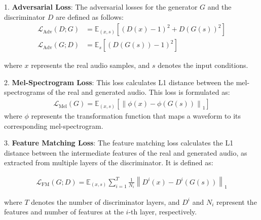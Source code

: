 1. \textbf{Adversarial Loss}: The adversarial losses for the generator \(G\) and the discriminator \(D\) are defined as follows:
\begin{align}
    \mathcal{L}_{\text{Adv}}(D; G) &= \mathbb{E}_{(x, s)} \left[(D(x) - 1)^2 + D(G(s))^2 \right] \\
    \mathcal{L}_{\text{Adv}}(G; D) &= \mathbb{E}_{s} \left[(D(G(s)) - 1)^2 \right]
\end{align}

where \(x\) represents the real audio samples, and \(s\) denotes the input conditions.

2. \textbf{Mel-Spectrogram Loss}: This loss calculates L1 distance between the mel-spectrograms of the real and generated audio. This loss is formulated as:
\begin{align}
    \mathcal{L}_{\text{Mel}}(G) = \mathbb{E}_{(x, s)} \left[\left\| \phi(x) - \phi(G(s)) \right\|_{1}\right]
\end{align}
where \(\phi\) represents the transformation function that maps a waveform to its corresponding mel-spectrogram.

3. \textbf{Feature Matching Loss}: The feature matching loss calculates the L1 distance between the intermediate features of the real and generated audio, as extracted from multiple layers of the discriminator. It is defined as:

\begin{align}
    \mathcal{L}_{\text{FM}}(G; D) = \mathbb{E}_{(x, s)} \sum_{i=1}^{T} \frac{1}{N_i} \left\| D^i(x) - D^i(G(s)) \right\|_{1}
\end{align}

where \(T\) denotes the number of discriminator layers, and \(D^i\) and \(N_i\) represent the features and number of features at the \(i\)-th layer, respectively.


